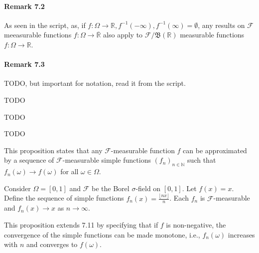 \paragraph{Remark 7.2}
\label{rem:7.2}
As seen in the script, as, if $f: \Omega \to \mathbb{R}, f^{-1}(-\infty), f^{-1}(\infty) = \emptyset$, any results on $\mathcal{F}$ meeasurable
functions $f: \Omega \to \overline{\mathbb{R}}$ also apply to $\mathcal{F}/\mathfrak{B}(\mathbb{R})$ measurable functions $f:\Omega\to \mathbb{R}$.

\paragraph{Remark 7.3}
\label{rem:7.3}
TODO, but important for notation, read it from the script.

\begin{proposition}[7.9]
    \label{prop:7.9}
    TODO
\end{proposition}

\begin{proposition}[7.10]
    \label{prop:7.10}
    TODO
\end{proposition}

\begin{definition}
    \label{def:7.6}
    TODO
\end{definition}

\begin{proposition}[]
    \label{prop:7.11}
    This proposition states that any $\mathcal{F}$-measurable function $f$ can be approximated by a sequence of $\mathcal{F}$-measurable simple functions $(f_n)_{n \in \mathbb{N}}$ such that $f_n(\omega) \rightarrow f(\omega)$ for all $\omega \in \Omega$.

\end{proposition}

\begin{myexample}[]
    \label{myex:prop7.11}
    Consider $\Omega = [0,1]$ and $\mathcal{F}$ be the Borel $\sigma$-field on $[0,1]$. Let $f(x) = x$. Define the sequence of simple functions $f_n(x) = \frac{\lfloor nx \rfloor}{n}$. Each $f_n$ is $\mathcal{F}$-measurable and $f_n(x) \rightarrow x$ as $n \rightarrow \infty$.
\end{myexample}

\begin{proposition}[]
    \label{prop:7.12}
This proposition extends 7.11 by specifying that if $f$ is non-negative, the convergence of the simple functions can be made monotone, i.e., $f_n(\omega)$ increases with $n$ and converges to $f(\omega)$.

\end{proposition}

